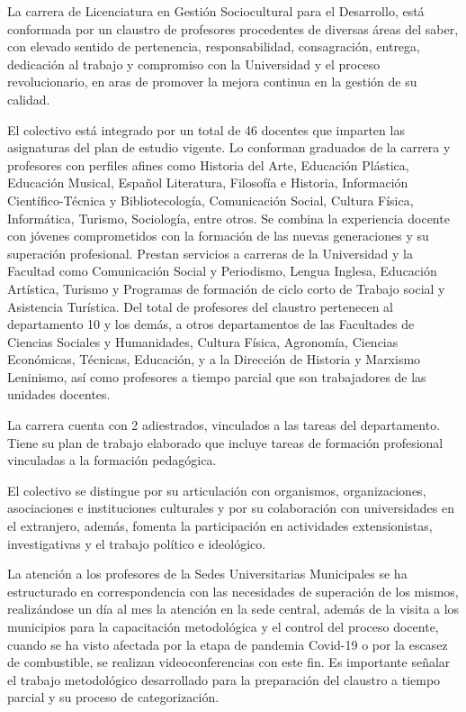 La carrera de Licenciatura en Gestión Sociocultural para el Desarrollo, está conformada por un claustro de profesores procedentes de diversas áreas del saber, con elevado sentido de pertenencia, responsabilidad, consagración, entrega, dedicación al trabajo y compromiso con la Universidad y el proceso revolucionario, en aras de promover la mejora continua en la gestión de su calidad. 

El colectivo está integrado por un total de 46 docentes que imparten las asignaturas del plan de estudio vigente. Lo conforman graduados de la carrera y profesores con perfiles afines como Historia del Arte, Educación Plástica, Educación Musical, Español Literatura, Filosofía e Historia, Información Científico-Técnica y Bibliotecología, Comunicación Social, Cultura Física, Informática, Turismo, Sociología, entre otros. Se combina la experiencia docente con jóvenes comprometidos con la formación de las nuevas generaciones y su superación profesional. Prestan servicios a carreras de la Universidad y la Facultad como Comunicación Social y Periodismo, Lengua Inglesa, Educación Artística, Turismo y Programas de formación de ciclo corto de Trabajo social y Asistencia Turística. 
Del total de profesores del claustro pertenecen al departamento 10 y los demás, a otros departamentos de las Facultades de Ciencias Sociales y Humanidades, Cultura Física, Agronomía, Ciencias Económicas, Técnicas, Educación, y a la Dirección de Historia y Marxismo Leninismo, así como profesores a tiempo parcial que son trabajadores de las unidades docentes. 

La carrera cuenta con 2 adiestrados, vinculados a las tareas del departamento. Tiene su plan de trabajo elaborado que incluye tareas de formación profesional vinculadas a la formación pedagógica.  

El colectivo se distingue por su articulación con organismos, organizaciones, asociaciones e instituciones culturales y por su colaboración con universidades en el extranjero, además, fomenta la participación en actividades extensionistas, investigativas y el trabajo político e ideológico. 

La atención a los profesores de la Sedes Universitarias Municipales se ha estructurado en correspondencia con las necesidades de superación de los mismos, realizándose un día al mes la atención en la sede central, además de la visita a los municipios para la capacitación metodológica y el control del proceso docente, cuando se ha visto afectada por la etapa de pandemia Covid-19 o por la escasez de combustible, se realizan videoconferencias con este fin. Es importante señalar el trabajo metodológico desarrollado para la preparación del claustro a tiempo parcial y su proceso de categorización.

